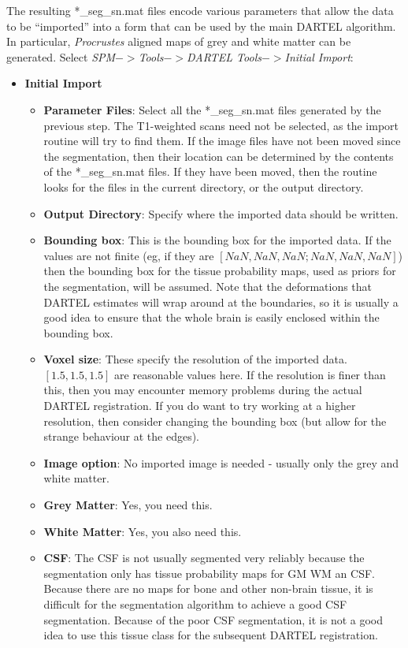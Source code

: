 The resulting *\_seg\_sn.mat files encode various parameters that allow the data to be ``imported'' into a form that can be used by the main DARTEL algorithm.
In particular, \emph{Procrustes} aligned maps of grey and white matter can be generated.
Select \emph{SPM$->$Tools$->$DARTEL Tools$->$Initial Import}:
\begin{itemize}
\item{{\bf Initial Import}
  \begin{itemize}
  \item{{\bf Parameter Files}: Select all the *\_seg\_sn.mat files generated by the previous step.  The T1-weighted scans need not be selected, as the import routine will try to find them.  If the image files have not been moved since the segmentation, then their location can be determined by the contents of the *\_seg\_sn.mat files. If they have been moved, then the routine looks for the files in the current directory, or the output directory.
  }
  \item{{\bf Output Directory}: Specify where the imported data should be written.
  }
  \item{{\bf Bounding box}: This is the bounding box for the imported data.  If the values are not finite (eg, if they are $[NaN, NaN, NaN; NaN, NaN, NaN]$) then the bounding box for the tissue probability maps, used as priors for the segmentation, will be assumed. Note that the deformations that DARTEL estimates will wrap around at the boundaries, so it is usually a good idea to ensure that the whole brain is easily enclosed within the bounding box.
  }
  \item{{\bf Voxel size}: These specify the resolution of the imported data.  $[1.5, 1.5, 1.5]$ are reasonable values here.  If the resolution is finer than this, then you may encounter memory problems during the actual DARTEL registration.
If you do want to try working at a higher resolution, then consider changing the bounding box (but allow for the strange behaviour at the edges).
  }
  \item{{\bf Image option}: No imported image is needed - usually only the grey and white matter.
  }
  \item{{\bf Grey Matter}: Yes, you need this.
  }
  \item{{\bf White Matter}: Yes, you also need this.
  }
  \item{{\bf CSF}: The CSF is not usually segmented very reliably because the segmentation only has tissue probability maps for GM WM an CSF.  Because there are no maps for bone and other non-brain tissue, it is difficult for the segmentation algorithm to achieve a good CSF segmentation. Because of the poor CSF segmentation, it is not a good idea to use this tissue class for the subsequent DARTEL registration.
  }
  \end{itemize}
}
\end{itemize}

